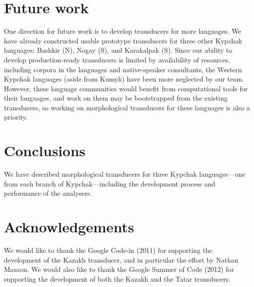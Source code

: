 \documentclass[a4paper,11pt,twocolumn]{article}
\begin{document}
\section{Future work}


One direction for future work is to develop transducers for more languages.  We have already constructed usable prototype transducers for three other Kypchak languages: Bashkir (N), Nogay (S), and Karakalpak (S).  Since our ability to develop production-ready transducers is limited by availability of resources, including corpora in the languages and native-speaker consultants, the Western Kypchak languages (aside from Kumyk) have been more neglected by our team.  However, these language communities would benefit from computational tools for their languages, and work on them may be bootstrapped from the existing transducers, so working on morphological transducers for these languages is also a priority.

\section{Conclusions}

We have described morphological transducers for three Kypchak languages---one from each branch of Kypchak---including the development process and performance of the analysers.

\section*{Acknowledgements}

We would like to thank the Google Code-in (2011) for supporting the development 
of the Kazakh transducer, and in particular the effort by Nathan Maxson. We 
would also like to thank the Google Summer of Code (2012) for supporting the 
development of both the Kazakh and the Tatar transducers. 



\end{document}
